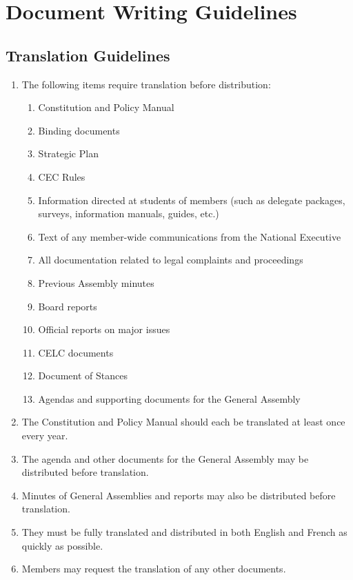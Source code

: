 \section{Document Writing Guidelines}
\label{document-writing-guidelines}

\subsection{Translation Guidelines}
\label{translation-guidelines}

\begin{enumerate}
 \item
  The following items require translation before distribution:

  \begin{enumerate}
   \item
    Constitution and Policy Manual
   \item
    Binding documents
   \item
    Strategic Plan
   \item
    CEC Rules
   \item
    Information directed at students of members (such as delegate packages, surveys, information manuals, guides, etc.)
   \item
    Text of any member-wide communications from the National Executive
   \item
    All documentation related to legal complaints and proceedings
   \item
    Previous Assembly minutes
   \item
    Board reports
   \item
    Official reports on major issues
   \item
    CELC documents
   \item
    Document of Stances
   \item
    Agendas and supporting documents for the General Assembly
  \end{enumerate}

 \item
  The Constitution and Policy Manual should each be translated at least once every year.
 \item
  The agenda and other documents for the General Assembly may be distributed before translation.
 \item
  Minutes of General Assemblies and reports may also be distributed before translation.
 \item
  They must be fully translated and distributed in both English and French as quickly as possible.
 \item
  Members may request the translation of any other documents.
\end{enumerate}

